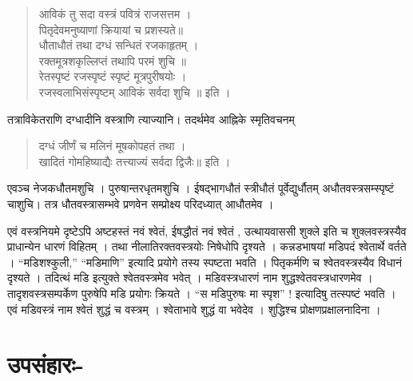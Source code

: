 \begin{verse}
आविकं तु सदा वस्त्रं पवित्रं राजसत्तम । \\
पितृदेवमनुष्याणां क्रियायां च प्रशस्यते॥ \\
धौताधौतं तथा दग्धं सन्धितं रजकाहृतम् । \\
रक्तमूत्रशकृल्लिप्तं तथापि परमं शुचि ॥\\
रेतस्पृष्टं रजस्पृष्टं स्पृष्टं मूत्रपुरीषयोः ।\\
रजस्वलाभिसंस्पृष्टम् आविकं सर्वदा शुचि ॥ इति ।
\end{verse}
तत्राविकेतराणि दग्धादीनि वस्त्राणि त्याज्यानि। तदर्थमेव आह्निके स्मृतिवचनम् 
\begin{verse}
दग्धं जीर्णं च मलिनं मूषकोपहतं तथा । \\
खादितं गोमहिष्याद्यैः तत्त्याज्यं सर्वदा द्विजैः॥ इति । 
\end{verse}
एवञ्च नेजकधौतमशुचि । पुरुषान्तरधृतमशुचि । ईषद्भागधौतं स्त्रीधौतं पूर्वेद्युर्धौतम् अधौतवस्त्रसम्स्पृष्टं चाशुचि। तत्र धौतवस्त्रासम्भवे प्रणवेन सम्प्रोक्ष्य परिदध्यात् आधौतमेव । 

एवं वस्त्रनियमे दृष्टेऽपि अष्टहस्तं नवं श्वेतं, ईषद्धौतं नवं श्वेतं , उत्थायवाससी शुक्ले इति च शुक्लवस्त्रस्यैव प्राधान्येन धारणं विहितम् । तथा नीलातिरक्तवस्त्रयोः निषेधोपि दृश्यते । कन्नडभाषयां मडिपदं श्वेतार्थे वर्तते । “मडिशश्कुली,” “मडिमाणि” इत्यादि प्रयोगे तस्य स्पष्टता भवति । पितृकर्मणि च श्वेतवस्त्रस्यैव विधानं दृश्यते । तदित्थं मडि इत्युक्ते श्वेतवस्त्रमेव भवेत् । मडिवस्त्रधारणं नाम शुद्धश्वेतवस्त्रधारणमेव । तादृशवस्त्रसम्पर्केण पुरुषेपि मडि प्रयोगः क्रियते । “स मडिपुरुषः मा स्पृश” ! इत्यादिषु तत्स्पष्टं भवति । एवं मडिवस्त्रं नाम श्वेतं शुद्धं च वस्त्रम् । श्वेताभावे शुद्धं वा भवेदेव । शुद्धिश्च प्रोक्षणप्रक्षालनादिना ।

\section*{उपसंहारः-} 

